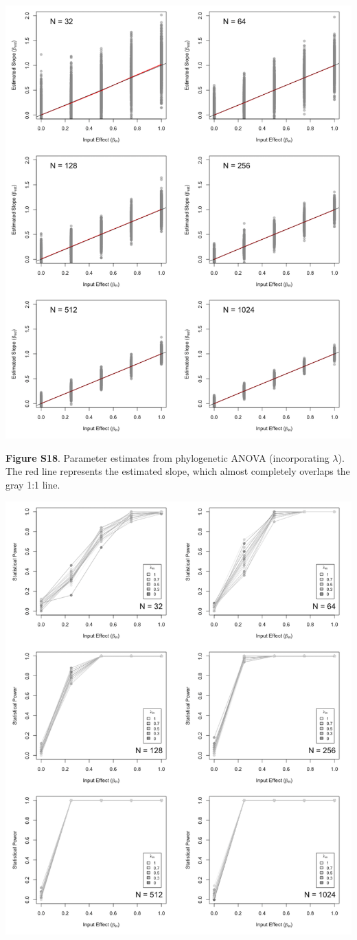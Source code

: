 \documentclass[
]{article}
\begin{document}
\includegraphics[width=0.95\linewidth]{fig.S18}

\textbf{Figure S18}. Parameter estimates from phylogenetic ANOVA
(incorporating \(\lambda\)). The red line represents the estimated
slope, which almost completely overlaps the gray 1:1 line.

\includegraphics[width=0.95\linewidth]{fig.S19}
\end{document}
